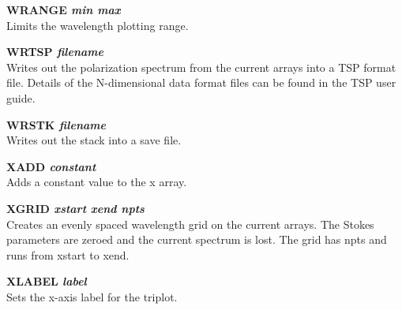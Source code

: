 {\bf WRANGE \it min max } \\
Limits the wavelength plotting range.

{\bf WRTSP \it filename } \\
Writes out the polarization spectrum from the current arrays into a  TSP
format file. Details of the N-dimensional data format files can
be found in the  TSP user guide.

{\bf WRSTK \it filename } \\
Writes out the stack into a save file.

{\bf XADD \it constant} \\
Adds a constant value to the x array.

{\bf XGRID \it xstart xend npts} \\
Creates an evenly spaced wavelength grid on the current arrays. The Stokes
parameters are zeroed and the current spectrum is lost. The grid has npts and
runs from xstart to xend.

{\bf XLABEL \it label} \\
Sets the x-axis label for the triplot.



